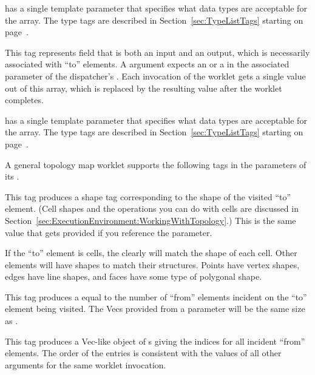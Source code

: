 \begin{description}
   has a single template parameter that specifies what
  data types are acceptable for the array. The type tags are described in
  Section~\ref{sec:TypeListTags} starting on page~\pageref{TypeTagList}.

\item[\sigtag{FieldInOut}] This tag represents field that is both an input
  and an output, which is necessarily associated with ``to'' elements. A
   argument expects an  or a
   in the associated parameter of the
  dispatcher's . Each invocation of the worklet gets a
  single value out of this array, which is replaced by the resulting value
  after the worklet completes.

   has a single template parameter that specifies what
  data types are acceptable for the array. The type tags are described in
  Section~\ref{sec:TypeListTags} starting on page~\pageref{TypeTagList}.

  \commoncontrolsignaturetags
\end{description}

A general topology map worklet supports the following tags in the
parameters of its \executionsignature.

\begin{description}
  \numericexecutionsignaturetags

\item[\sigtag{CellShape}] This tag produces a shape tag corresponding to
  the shape of the visited ``to'' element. (Cell shapes and the operations
  you can do with cells are discussed in
  Section~\ref{sec:ExecutionEnvironment:WorkingWithTopology}.) This is the
  same value that gets provided if you reference the
   parameter.

  If the ``to'' element is cells, the  clearly will match
  the shape of each cell. Other elements will have shapes to match their
  structures. Points have vertex shapes, edges have line shapes, and faces
  have some type of polygonal shape.

\item[\sigtag{FromCount}] This tag produces a  equal to
  the number of ``from'' elements incident on the ``to'' element being
  visited. The Vecs provided from a  parameter
  will be the same size as .

\item[\sigtag{FromIndices}] This tag produces a Vec-like object of
  s giving the indices for all incident ``from'' elements. The
  order of the entries is consistent with the values of all other
   arguments for the same worklet invocation.

  \commonexecutionsignaturetags
\end{description}

